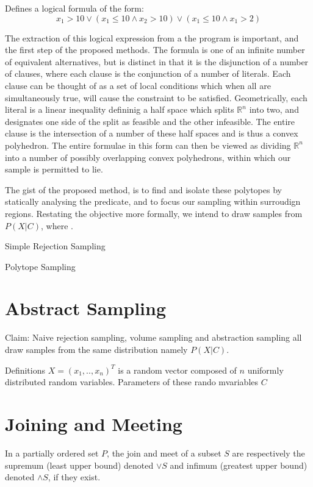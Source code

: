 Defines a logical formula of the form:
\begin{equation}
x_1 > 10 \lor (x_1 \le 10 \land x_2 > 10) \lor (x_1 \le 10 \land x_1 > 2)
\end{equation}

The extraction of this logical expression from a the program is important, and the first step of the proposed methods.
The formula is one of an infinite number of equivalent alternatives, but is distinct in that it is the disjunction of a number of clauses, where each clause is the conjunction of a number of literals.
Each clause can be thought of as a set of local conditions which when all are simultaneously true, will cause the constraint to be satisfied.
Geometrically, each literal is a linear inequality defininig a half space which splits $\mathbb{R}^n$ into two, and designates one side of the split as feasible and the other infeasible.
The entire clause is the intersection of a number of these half spaces and is thus a convex polyhedron.
The entire formulae in this form can then be viewed as dividing $\mathbb{R}^n$ into a number of possibly overlapping convex polyhedrons, within which our sample is permitted to lie.

The gist of the proposed method, is to find and isolate these polytopes by statically analysing the predicate, and to focus our sampling within surroudign regions.
Restating the objective more formally, we intend to draw samples from $P(X \vert C)$, where   .

Simple Rejection Sampling

Polytope Sampling

\section{Abstract Sampling}

Claim: Naive rejection sampling, volume sampling and abstraction sampling all draw samples from the same distribution namely $P(X | C)$.

Definitions
$X = (x_1,..,x_n)^T$ is a random vector composed of $n$ uniformly distributed random variables.
Parameters of these rando mvariables
$C$


\section{Joining and Meeting}
In a partially ordered set $P$, the join and meet of a subset $S$ are respectively the supremum (least upper bound) denoted $\lor S$ and infimum (greatest upper bound) denoted $\land S$, if they exist.  


